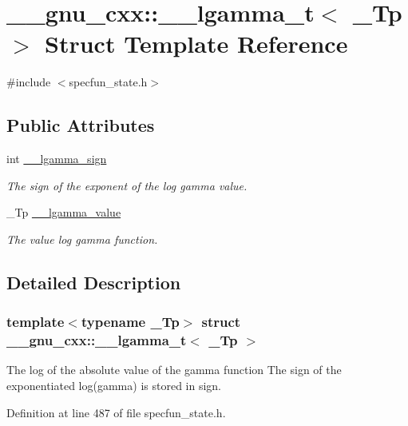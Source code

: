 \hypertarget{struct____gnu__cxx_1_1____lgamma__t}{}\section{\+\_\+\+\_\+gnu\+\_\+cxx\+:\+:\+\_\+\+\_\+lgamma\+\_\+t$<$ \+\_\+\+Tp $>$ Struct Template Reference}
\label{struct____gnu__cxx_1_1____lgamma__t}


{\ttfamily \#include $<$specfun\+\_\+state.\+h$>$}

\subsection*{Public Attributes}
\begin{DoxyCompactItemize}
\item 
int \hyperlink{struct____gnu__cxx_1_1____lgamma__t_a8aecdc9e5f69e729e96dc50f0c57b331}{\+\_\+\+\_\+lgamma\+\_\+sign}
\begin{DoxyCompactList}\small\item\em The sign of the exponent of the log gamma value. \end{DoxyCompactList}\item 
\+\_\+\+Tp \hyperlink{struct____gnu__cxx_1_1____lgamma__t_a916af5560acafd8dcf25c42fd28deef5}{\+\_\+\+\_\+lgamma\+\_\+value}
\begin{DoxyCompactList}\small\item\em The value log gamma function. \end{DoxyCompactList}\end{DoxyCompactItemize}


\subsection{Detailed Description}
\subsubsection*{template$<$typename \+\_\+\+Tp$>$\newline
struct \+\_\+\+\_\+gnu\+\_\+cxx\+::\+\_\+\+\_\+lgamma\+\_\+t$<$ \+\_\+\+Tp $>$}

The log of the absolute value of the gamma function The sign of the exponentiated log(gamma) is stored in sign. 

Definition at line 487 of file specfun\+\_\+state.\+h.



